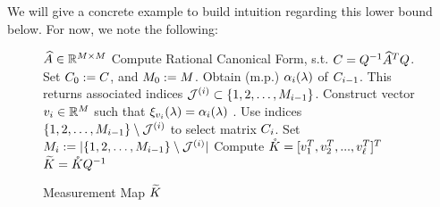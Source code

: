 We will give a concrete example to build intuition regarding this lower bound below. For now, we note the following:
\begin{figure}[t!]
	\begin{algorithm}[H]
		\caption{Measurement Map $\widetilde{K}$}
		\label{alg:measmap}
		\begin{algorithmic}
				 $\widehat{A}\in\mathbb{R}^{M\times M}$
				\STATE Compute Rational Canonical Form, s.t. $C = Q^{-1}\widehat{A}^TQ$. Set $C_0:=C$, and
				$M_0:=M$. 
				\STATE Obtain (m.p.) $\alpha_i(\lambda)$ of $C_{i-1}$. 
				This returns associated indices $\mathcal{J}^{({i})}\subset\{1,2,\dots,M_{i-1}\}$. 
				\STATE Construct vector $v_i \in \mathbb{R}^{M}$ such that 
				$\xi_{v_i}(\lambda)=\alpha_{i}(\lambda)$ .
				\STATE Use indices $\{1,2,\dots,M_{i-1}\}\setminus\mathcal{J}^{({i})}$ to select matrix $C_i$. Set 
				$M_i:= |\{1,2,\dots,M_{i-1}\}\setminus\mathcal{J}^{({i})}|$
				\ENDFOR
				\STATE Compute $ \mathring{K} = [v_1^T, v_2^T,...,v_{\ell}^T]^T$
				 $\widetilde{K} =\mathring{K}Q^{-1}$
		\end{algorithmic}
	\end{algorithm}
\end{figure}


